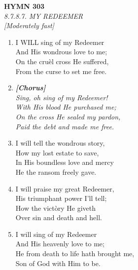 \newpage
\begin{center}
    {\Large \textbf{HYMN 303}}
    \\
    \textit{8.7.8.7. MY REDEEMER}
    \\
    \textit{\small [Moderately fast]}
\end{center}
\vspace{1em}

\begin{enumerate}
    \item I WILL sing of my Redeemer \\
        And His wondrous love to me; \\
        On the cru\`el cross He suffered, \\
        From the curse to set me free.

    \item[] \vspace{0.4em}
    \textbf{\textit{[Chorus]}} \\
    \textit{Sing, oh sing of my Redeemer!} \\
    \textit{With His blood He purchased me;} \\
    \textit{On the cross He sealed my pardon,} \\
    \textit{Paid the debt and made me free.}
    \vspace{0.4em}

    \item I will tell the wondrous story, \\
        How my lost estate to save, \\
        In His boundless love and mercy \\
        He the ransom freely gave.

    \item I will praise my great Redeemer, \\
        His triumphant power I'll tell; \\
        How the vict\`ory He giveth \\
        Over sin and death and hell.

    \item I will sing of my Redeemer \\
        And His heavenly love to me; \\
        He from death to life hath brought me, \\
        Son of God with Him to be.

\end{enumerate}

